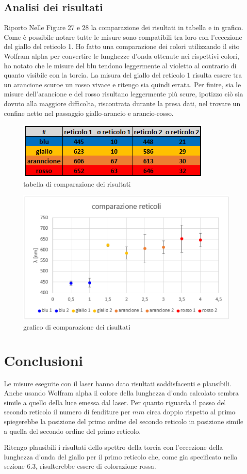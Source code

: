 \documentclass{article}
\begin{document}
\pagebreak
\subsection{Analisi dei risultati}
Riporto Nelle Figure 27 e 28 la comparazione dei risultati in tabella e in grafico. Come è possibile notare tutte le misure sono compatibili tra loro con l'eccezione del giallo del reticolo 1. Ho fatto una comparazione dei colori utilizzando il sito Wolfram alpha per convertire le lunghezze d'onda ottenute nei rispettivi colori, ho notato che le misure del blu tendono leggermente al violetto al contrario di quanto visibile con la torcia. La misura del giallo del reticolo 1 risulta essere tra un arancione scuroe un rosso vivace e ritengo sia quindi errata. Per finire, sia le misure dell'arancione e del  rosso risultano leggermente più scure, ipotizzo ciò sia dovuto alla maggiore difficolta, riscontrata durante la presa dati, nel trovare un confine netto nel passaggio giallo-arancio e arancio-rosso.


\begin{figure}[h!]
  \centering
  \includegraphics[width=0.5\linewidth]{IM comparazione risultati}
  \caption{tabella di comparazione dei risultati}
\end{figure}

\begin{figure}[h!] 
  \centering
  \includegraphics[width=0.6\linewidth]{IM grafico risultati}
  \caption{grafico di comparazione dei risultati}
\end{figure}



\pagebreak
\section{Conclusioni}
Le misure eseguite con il laser hanno dato risultati soddisfacenti e plausibili. Anche usando Wolfram alpha il colore della lunghezza d'onda calcolato sembra simile a quello della luce emessa dal laser. Per quanto riguarda il passo del secondo reticolo il numero di fenditure per $mm$ circa doppio rispetto al primo spiegerebbe la posizione del primo ordine del secondo reticolo in posizione simile a quella del secondo ordine del primo reticolo. 

Ritengo plausibili i risultati dello spettro della torcia con l'eccezione della lunghezza d'onda del giallo per il primo reticolo che, come gia specificato nella sezione 6.3, risulterebbe essere di colorazione rossa.
\end{document}
